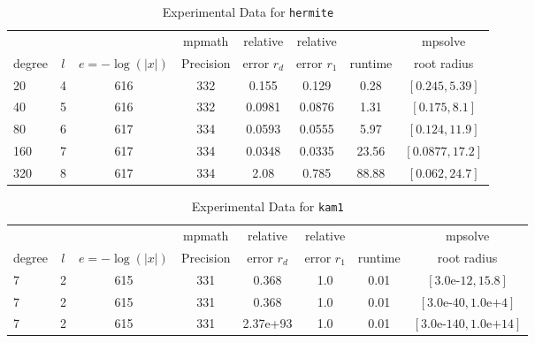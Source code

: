 \documentclass[sigconf]{acmart}
\begin{document}
\begin{table}[t]
\caption{Experimental Data for \texttt{hermite}} %
\label{tab:hermite}
\vskip -0.15in
\begin{center}
\begin{small}
\begin{sc}
\begin{tabular}{lccccccc}
\toprule
&  &  & mpmath & relative  & relative &  & mpsolve \\
degree  & $l$& $e=-\log(|x|)$& Precision &error $r_d$       & error $r_1$ &runtime& root radius\\
\midrule
 20 & 4 & 616 & 332 & 0.155 & 0.129 & 0.28 & $[0.245, 5.39]$\\
 40 & 5 & 616 & 332 & 0.0981 & 0.0876 & 1.31 & $[0.175, 8.1]$\\
 80 & 6 & 617 & 334 & 0.0593 & 0.0555 & 5.97 & $[0.124, 11.9]$\\
 160 & 7 & 617 & 334 & 0.0348 & 0.0335 & 23.56 & $[0.0877, 17.2]$\\
 320 & 8 & 617 & 334 & 2.08 & 0.785 & 88.88 & $[0.062, 24.7]$\\
\bottomrule
\end{tabular}
\end{sc}
\end{small}
\end{center}
\vskip 0.05in
\end{table}

\begin{table}[t]
\caption{Experimental Data for \texttt{kam1}} %
\label{tab:kam1}
\vskip -0.15in
\begin{center}
\begin{small}
\begin{sc}
\begin{tabular}{lccccccc}
\toprule
&  &  & mpmath & relative  & relative &  & mpsolve \\
degree  & $l$& $e=-\log(|x|)$& Precision &error $r_d$       & error $r_1$ &runtime& root radius\\
\midrule
 7 & 2 & 615 & 331 & 0.368 & 1.0 & 0.01 & $[3.0\text{e-}12, 15.8]$\\
 7 & 2 & 615 & 331 & 0.368 & 1.0 & 0.01 & $[3.0\text{e-}40, 1.0\text{e+}4]$\\
 7 & 2 & 615 & 331 & 2.37e+93 & 1.0 & 0.01 & $[3.0\text{e-}140, 1.0\text{e+}14]$\\
\bottomrule
\end{tabular}
\end{sc}
\end{small}
\end{center}
\vskip 0.05in
\end{table}
\end{document}
